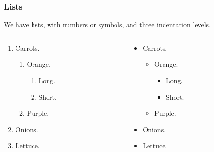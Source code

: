 \documentclass{beamer}
\begin{document}
\begin{frame}
    \frametitle{Lists}

    We have lists, with numbers or symbols, and three indentation levels.

    \begin{columns}
        \begin{column}{0.5\textwidth}
            \begin{enumerate}
                \item Carrots.
                      \begin{enumerate}
                          \item Orange.
                                \begin{enumerate}
                                    \item Long.
                                    \item Short.
                                \end{enumerate}
                          \item Purple.
                      \end{enumerate}
                \item Onions.
                \item Lettuce.
            \end{enumerate}
        \end{column}
        \begin{column}{0.5\textwidth}  %
            \begin{itemize}
                \item Carrots.
                      \begin{itemize}
                          \item Orange.
                                \begin{itemize}
                                    \item Long.
                                    \item Short.
                                \end{itemize}
                          \item Purple.
                      \end{itemize}
                \item Onions.
                \item Lettuce.
            \end{itemize}
        \end{column}
    \end{columns}

\end{frame}
\end{document}
